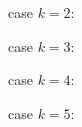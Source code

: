 \documentclass[a4paper,8pt]{article}
\begin{document}
\scriptsize
case $k=2$:
{}

case $k=3$:
{}

case $k=4$:
{}

case $k=5$:
{}

\end{document}
